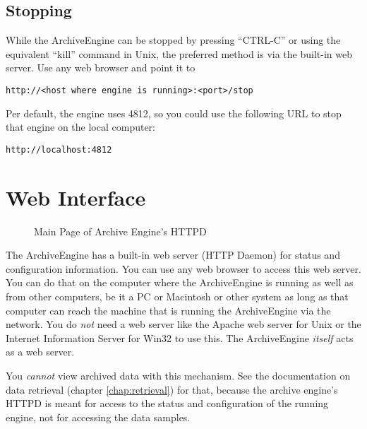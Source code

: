 \subsection{Stopping}
While the ArchiveEngine can be stopped by pressing ``CTRL-C''
or using the equivalent ``kill'' command in Unix, the preferred method is
via the built-in web server. Use any web browser and point it to

\begin{lstlisting}[frame=none,keywordstyle=\sffamily]
http://<host where engine is running>:<port>/stop
\end{lstlisting}

\noindent Per default, the engine uses 4812, so you could use the
following URL to stop that engine on the local computer:

\begin{lstlisting}[frame=none,keywordstyle=\sffamily]
http://localhost:4812
\end{lstlisting}

\section{Web Interface} \label{sec:enginehttp} %
\begin{figure}[htb]
\begin{center}
\end{center}
\caption{\label{fig:engine:main}Main Page of Archive Engine's HTTPD}
\end{figure}

The ArchiveEngine has a built-in web server (HTTP Daemon) for status
and configuration information.  You can use any web browser to access
this web server.  You can do that on the computer where the
ArchiveEngine is running as well as from other computers, be it a PC
or Macintosh or other system as long as that computer can reach the
machine that is running the ArchiveEngine via the network.  You do
\emph{not} need a web server like the Apache web server for Unix or
the Internet Information Server for Win32 to use this. The
ArchiveEngine \emph{itself} acts as a web server.

You \emph{cannot} view archived data with this mechanism.  See the
documentation on data retrieval (chapter \ref{chap:retrieval}) for
that, because the archive engine's HTTPD is meant for access to the
status and configuration of the running engine, not for accessing the
data samples.

